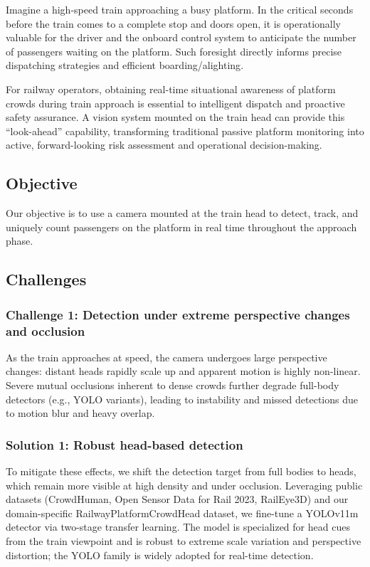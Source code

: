 Imagine a high-speed train approaching a busy platform. In the critical seconds before the train comes to a complete stop and doors open, it is operationally valuable for the driver and the onboard control system to anticipate the number of passengers waiting on the platform. Such foresight directly informs precise dispatching strategies and efficient boarding/alighting\cite{214,215,216}.

For railway operators, obtaining real-time situational awareness of platform crowds during train approach is essential to intelligent dispatch and proactive safety assurance\cite{214,215,216}. A vision system mounted on the train head can provide this “look-ahead” capability, transforming traditional passive platform monitoring into active, forward-looking risk assessment and operational decision-making.

\subsection{Objective}

Our objective is to use a camera mounted at the train head to detect, track, and uniquely count passengers on the platform in real time throughout the approach phase.

\subsection{Challenges}

\subsubsection{Challenge 1: Detection under extreme perspective changes and occlusion}
As the train approaches at speed, the camera undergoes large perspective changes: distant heads rapidly scale up and apparent motion is highly non-linear. Severe mutual occlusions inherent to dense crowds further degrade full-body detectors (e.g., YOLO variants), leading to instability and missed detections due to motion blur and heavy overlap\cite{29_kaur_systematic_2024,30_khan_passenger_2020,01_noauthor_deep_2024,66_zhang_bus_2020,33or34_li_lightweight_2023}.

\subsubsection{Solution 1: Robust head-based detection}
To mitigate these effects, we shift the detection target from full bodies to heads, which remain more visible at high density and under occlusion. Leveraging public datasets (CrowdHuman, Open Sensor Data for Rail 2023, RailEye3D) and our domain-specific RailwayPlatformCrowdHead dataset, we fine-tune a YOLOv11m detector via two-stage transfer learning\cite{shao2018crowdhuman,OpenSensorDataforRail2023,RailEye3D_Dataset}. The model is specialized for head cues from the train viewpoint and is robust to extreme scale variation and perspective distortion; the YOLO family is widely adopted for real-time detection\cite{02_noauthor_review_nodate,141}.

